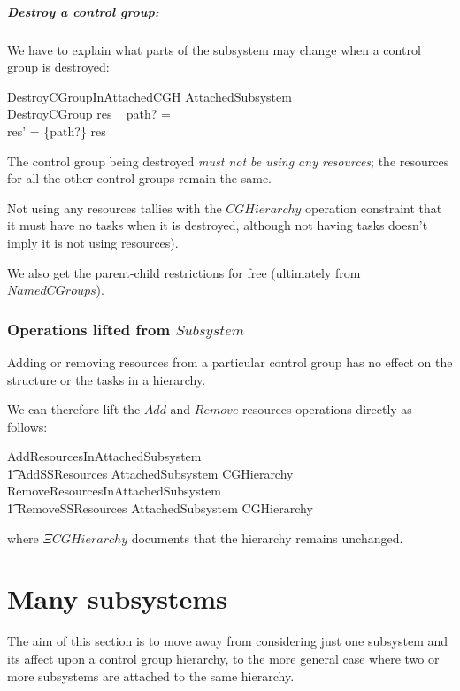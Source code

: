 \documentclass[a4paper,twoside,12pt]{article}
\begin{document}
\subparagraph{Destroy a control group:}
We have to explain what parts of the subsystem may change when a control group is destroyed:

\begin{schema}{DestroyCGroupInAttachedCGH}
\Delta AttachedSubsystem \\
DestroyCGroup
\where
res ~ path? = \emptyset \\
res' = \{path?\} \ndres res
\end{schema}
The control group being destroyed \emph{must not be using any resources};
the resources for all the other control groups remain
the same.

Not using any resources tallies with the $CGHierarchy$ operation constraint that it must have no tasks when it is
destroyed, although not having tasks doesn't imply it is not using resources).

We also get the parent-child restrictions for free (ultimately from $NamedCGroups$).

\subsubsection{Operations lifted from $Subsystem$}

Adding or removing resources from a particular control group has no effect on the structure or the tasks
in a hierarchy.

We can therefore lift the $Add$ and $Remove$ resources operations directly as follows:

\begin{zed}
AddResourcesInAttachedSubsystem  \\
\t1 AddSSResources \land \Delta AttachedSubsystem \land \Xi CGHierarchy
\also
RemoveResourcesInAttachedSubsystem  \\
\t1 RemoveSSResources \land \Delta AttachedSubsystem \land \Xi CGHierarchy
\end{zed}
where $\Xi CGHierarchy$ documents that the hierarchy remains unchanged.

\section{Many subsystems}

The aim of this section is to move away from considering just one subsystem and its affect upon
a control group hierarchy, to the more general case where two or more subsystems are attached
to the same hierarchy.
\end{document}
